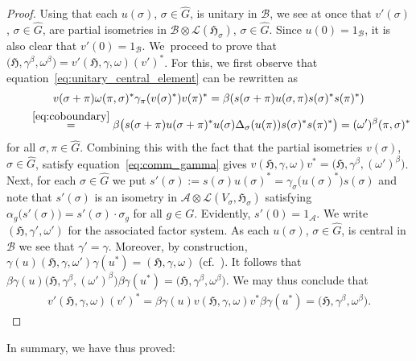 \documentclass[pdftex]{sigma}
\numberwithin{equation}{section}
\newcommand*{\tensor}{\otimes}		%
\newcommand*{\hilb}{\mathfrak}		%
\newcommand*{\alg}{\mathcal}		%
\newcommand*{\hH}{\hilb{H}}			%
\newcommand*{\one}{1}				%
\newcommand*{\aA}{\alg{A}}			%
\newcommand*{\aB}{\alg{B}} 			%
\newcommand*{\End}{\mathcal{L}} %
\begin{document}
\begin{proof}
	Using that each $u(\sigma)$, $\sigma \in \hat G$, is unitary in $\aB$, we see at once that $v'(\sigma)$, $\sigma \in \hat G$, are partial isometries in $\aB \tensor \End(\hH_\sigma)$, $\sigma \in \hat G$.
	Since $u(0) = \one_\aB$, it is also clear that $v'(0) = \one_\aB$.
	We~proceed to prove that $\big(\hH, \gamma^\beta, \omega^\beta\big) = v'(\hH, \gamma, \omega)(v')^*$.
	For this, we first observe that equation~\eqref{eq:unitary_central_element} can be rewritten as
	\begin{gather*}
		v(\sigma+\pi) \omega(\pi, \sigma)^* \gamma_\pi ( v(\sigma)^* ) v(\pi)^*
		=
		\beta ( s(\sigma+\pi) u(\sigma, \pi) s(\sigma)^* s(\pi)^* )
		\\
		\qquad{} \overset{\eqref{eq:coboundary}} {=}
		\beta \bigl( s(\sigma+\pi) u(\sigma+\pi)^* u(\sigma) \Delta_\sigma ( u(\pi) ) s(\sigma)^* s(\pi)^* \bigr)
		=
		(\omega')^\beta(\pi, \sigma)^*
	\end{gather*}
	for all $\sigma, \pi \in \hat G$.
	Combining this with the fact that the partial isometries $v(\sigma)$, $\sigma \in \hat G$, satisfy equation~\eqref{eq:comm_gamma} gives $v(\hH, \gamma, \omega)v^* = \bigl( \hH, \gamma^\beta, (\omega')^\beta \bigr)$.
	Next, for each $\sigma \in \hat G$ we put $s'(\sigma) := s(\sigma) u(\sigma)^* = \gamma_\sigma \bigl( u(\sigma)^* \bigr) s(\sigma)$ and note that $s'(\sigma)$ is an isometry in $\aA \tensor \End(V_\sigma,\hH_\sigma)$ satisfying $\alpha_g\big(s'(\sigma)\big)=s'(\sigma) \cdot \sigma_g$ for all $g \in G$.
	Evidently, $s'(0) = \one_\aA$.
	We write $(\hH, \gamma', \omega')$ for the associated factor system.
	As each $u(\sigma)$, $\sigma \in \hat G$, is central in $\aB$ we see that $\gamma' = \gamma$.
	Moreover, by construction, $\gamma(u)(\hH, \gamma, \omega')\gamma(u^*) = (\hH, \gamma, \omega)$ (cf.~\cite[Lemma~4.3]{SchWa17c}).
	It follows that $\beta \gamma(u) \bigl( \hH, \gamma^\beta, (\omega')^\beta \bigr) \beta \gamma(u^*) = \big(\hH, \gamma^\beta, \omega^\beta\big)$.
	We may thus conclude that
	\begin{gather*}
		v'(\hH, \gamma, \omega) (v')^*
		= \beta \gamma(u) v (\hH, \gamma, \omega) v^* \beta \gamma(u^*)
		= \big(\hH, \gamma^\beta, \omega^\beta\big).
		\tag*{\qed}
	\end{gather*}
	\renewcommand{\qed}{}
\end{proof}

In summary, we have thus proved:
\end{document}
